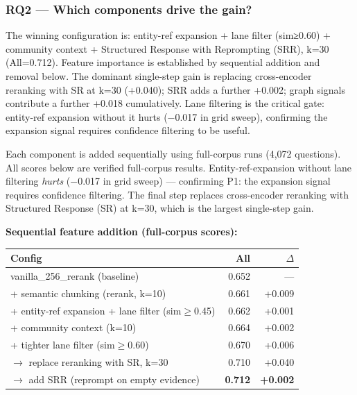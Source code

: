 \documentclass[
]{article}
\begin{document}
\subsubsection{RQ2 --- Which components drive the
gain?}\label{rq2-which-components-drive-the-gain}

The winning configuration is: entity-ref expansion + lane filter
(sim≥0.60) + community context + Structured Response with Reprompting
(SRR), k=30 (All=0.712). Feature importance is established by sequential
addition and removal below. The dominant single-step gain is replacing
cross-encoder reranking with SR at k=30 (+0.040); SRR adds a further
+0.002; graph signals contribute a further +0.018 cumulatively. Lane
filtering is the critical gate: entity-ref expansion without it hurts
(−0.017 in grid sweep), confirming the expansion signal requires
confidence filtering to be useful.

Each component is added sequentially using full-corpus runs (4,072
questions). All scores below are verified full-corpus results.
Entity-ref-expansion without lane filtering \emph{hurts} (−0.017 in grid
sweep) --- confirming P1: the expansion signal requires confidence
filtering. The final step replaces cross-encoder reranking with
Structured Response (SR) at k=30, which is the largest single-step gain.

\textbf{Sequential feature addition (full-corpus scores):}

\begin{small}
\setlength{\tabcolsep}{4pt}
\begin{longtable}{p{3.5in}rr}
\toprule
\textbf{Config} & \textbf{All} & \textbf{$\Delta$} \\
\midrule
\endhead
vanilla\_256\_rerank (baseline) & 0.652 & — \\
+ semantic chunking (rerank, k=10) & 0.661 & +0.009 \\
+ entity-ref expansion + lane filter (sim$\geq$0.45) & 0.662 & +0.001 \\
+ community context (k=10) & 0.664 & +0.002 \\
+ tighter lane filter (sim$\geq$0.60) & 0.670 & +0.006 \\
$\rightarrow$ replace reranking with SR, k=30 & 0.710 & +0.040 \\
$\rightarrow$ add SRR (reprompt on empty evidence) & \textbf{0.712} & \textbf{+0.002} \\
\bottomrule
\end{longtable}
\end{small}
\end{document}
